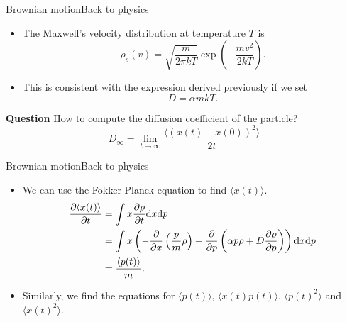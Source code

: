\documentclass[usenames,dvipsnames,svgnames,10pt,aspectratio=169]{beamer}
\begin{document}
\begin{frame}[t, c]{Brownian motion}{Back to physics}
	\begin{itemize}
		\item The Maxwell's velocity distribution at temperature $T$ is
		$$
		\rho_s(v) = \sqrt{ \frac{m}{2\pi kT} } \exp \left( -\frac{mv^2}{2kT} \right).
		$$

		\item This is consistent with the expression derived previously if we set
		$$
		D = \alpha m k T.
		$$
	\end{itemize}

	\begin{block}{\centering \textbf{Question}}
		\centering
		How to compute the diffusion coefficient of the particle?
		$$
		D_{\infty} = \lim_{t \to \infty} \frac{\langle \left( x(t) - x(0) \right)^2 \rangle}{2t}
		$$
	\end{block}

	\vspace{1cm}
\end{frame}

\begin{frame}[t, c]{Brownian motion}{Back to physics}
	\begin{itemize}
		\item We can use the Fokker-Planck equation to find $\langle x(t) \rangle$.
		\begin{equation}
			\begin{aligned}
				\frac{\partial \langle x(t) \rangle}{\partial t} & = \int x \frac{\partial \rho}{\partial t} \mathrm{d}x \mathrm{d}p \\
				& = \int x \left( -\frac{\partial}{\partial x} \left( \frac{p}{m} \rho \right) + \frac{\partial}{\partial p} \left( \alpha p \rho + D \frac{\partial \rho}{\partial p} \right) \right) \mathrm{d}x \mathrm{d}p \\
				& = \frac{ \langle p(t) \rangle }{m}.
			\end{aligned}
			\notag
		\end{equation}

		\item Similarly, we find the equations for $\langle p(t) \rangle$, $\langle x(t) p(t) \rangle$, $\langle p(t)^2 \rangle$ and $\langle x(t)^2 \rangle$.
	\end{itemize}

	\vspace{1cm}
\end{frame}
\end{document}
